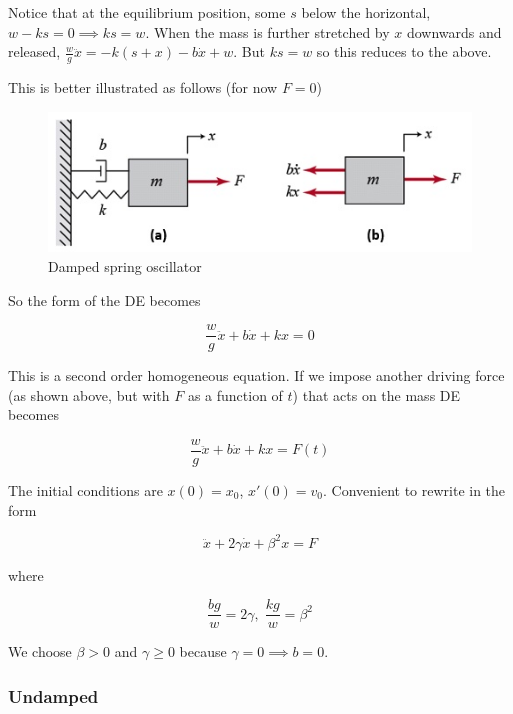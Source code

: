 Notice that at the equilibrium position, some $s$ below the horizontal, $w-ks=0\implies ks=w$.
When the mass is further stretched by $x$ downwards and released, $\frac{w}{g}\ddot x=-k(s+x)-b\dot x+w$.
But $ks=w$ so this reduces to the above.

This is better illustrated as follows (for now $F=0$)

\begin{figure}[H]
    \centering
    \includegraphics[scale=0.6]{figures/a-Mass-Spring-Damper-System-b-free-body-diagram.jpg}
    \caption{Damped spring oscillator}
\end{figure}

So the form of the DE becomes

\begin{equation}
    \frac{w}{g}\ddot x+b\dot x+kx=0
\end{equation}

This is a second order homogeneous equation. If we impose another driving force (as shown above, but with $F$ as a function of $t$) that acts on the mass DE becomes

\begin{equation}
    \frac{w}{g}\ddot x+b\dot x+kx=F(t)
\end{equation}

The initial conditions are $x(0)=x_0$, $x'(0)=v_0$. Convenient to rewrite in the form

\begin{equation}
    \ddot x+2\gamma \dot x+\beta^2 x = F
\end{equation}

where

\begin{equation}
    \frac{bg}{w}=2\gamma,\; \frac{kg}{w}=\beta^2
\end{equation}

We choose $\beta>0$ and $\gamma \geq 0$ because $\gamma = 0\implies b=0$.

\subsubsection{Undamped}

